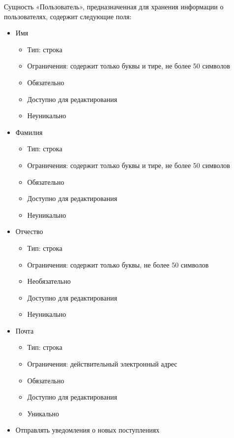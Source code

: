 \documentclass[data-specification.tex]{subfiles}
\begin{document}
\par
Сущность «Пользователь», предназначенная для хранения информации о пользователях, содержит следующие поля:
\begin{itemize}
    \item Имя
    \begin{itemize}
        \item Тип: строка
        \item Ограничения: содержит только буквы и тире, не более 50 символов
        \item Обязательно
        \item Доступно для редактирования
        \item Неуникально
    \end{itemize}
    \item Фамилия
    \begin{itemize}
        \item Тип: строка
        \item Ограничения: содержит только буквы и тире, не более 50 символов
        \item Обязательно
        \item Доступно для редактирования
        \item Неуникально
    \end{itemize}
    \item Отчество
    \begin{itemize}
        \item Тип: строка
        \item Ограничения: содержит только буквы, не более 50 символов
        \item Необязательно
        \item Доступно для редактирования
        \item Неуникально
    \end{itemize}
    \item Почта
    \begin{itemize}
        \item Тип: строка
        \item Ограничения: действительный электронный адрес
        \item Обязательно
        \item Доступно для редактирования
        \item Уникально
    \end{itemize}
    \item Отправлять уведомления о новых поступлениях

\end{itemize}
\end{document}
